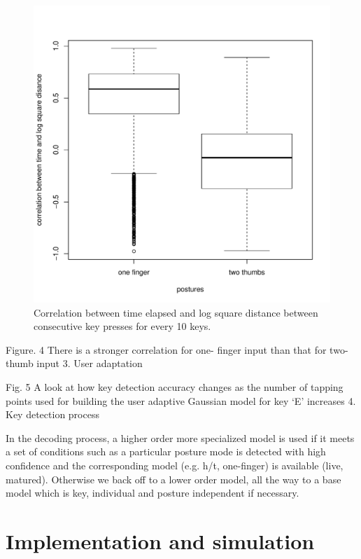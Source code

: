 \documentclass{sigchi}
\begin{document}
\begin{figure}[tb]
  \centering
  \includegraphics[width=1\columnwidth]{figures/boxplot.pdf}
  \caption{Correlation between time elapsed and log square distance between
  consecutive key presses for every 10 keys.}
  \label{fig:boxplot}
\end{figure}

Figure. 4  There is a stronger correlation for one- 
finger input than that for two-thumb input
3. User adaptation

Fig. 5  A look at how key detection accuracy changes as the number of tapping points used for building the user adaptive Gaussian model for key ‘E’ increases
4. Key detection process 

In the decoding process, a higher order more specialized model is used if it meets a set of conditions such as a particular posture mode is detected with high confidence and the corresponding model (e.g. h/t, one-finger) is available (live, matured). Otherwise we back off to a lower order model, all the way to a base model which is key, individual and posture independent if necessary.

\section{Implementation and simulation}
\end{document}

